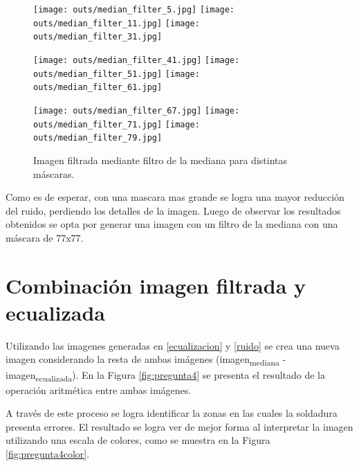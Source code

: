 \documentclass[
  letterpaper,
  twocolumn,
  9pt,
  journal,
  final]{IEEEtran}
\begin{document}
\begin{figure}[!tbh]
\centering
\texttt{[image: outs/median\_filter\_5.jpg]}\quad
\texttt{[image: outs/median\_filter\_11.jpg]}\quad
\texttt{[image: outs/median\_filter\_31.jpg]}

\medskip

\texttt{[image: outs/median\_filter\_41.jpg]}\quad
\texttt{[image: outs/median\_filter\_51.jpg]}\quad
\texttt{[image: outs/median\_filter\_61.jpg]}

\medskip

\texttt{[image: outs/median\_filter\_67.jpg]}\quad
\texttt{[image: outs/median\_filter\_71.jpg]}\quad
\texttt{[image: outs/median\_filter\_79.jpg]}


\caption{Imagen filtrada mediante filtro de la mediana para distintas máscaras.}
\label{fig:median_grid}
\end{figure}


Como es de esperar, con una mascara mas grande se logra una mayor reducción del ruido, perdiendo los detalles de la imagen. Luego de observar los resultados obtenidos se opta por generar una imagen con un filtro de la mediana con una máscara de 77x77.




\section{Combinación imagen filtrada y ecualizada}\label{p4}

Utilizando las imagenes generadas en \ref{ecualizacion} y \ref{ruido} se crea una nueva imagen considerando la resta de ambas imágenes (imagen\textsubscript{mediana} - imagen\textsubscript{ecualizada}). En la Figura \ref{fig:pregunta4} se presenta el resultado de la operación aritmética entre ambas imágenes.

A través de este proceso se logra identificar la zonas en las cuales la soldadura presenta errores. El resultado se logra ver de mejor forma al interpretar la imagen utilizando una escala de colores, como se muestra en la Figura \ref{fig:pregunta4color}.
\end{document}
